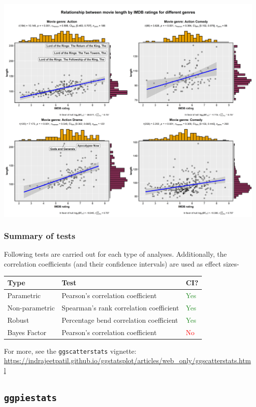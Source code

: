 \documentclass[]{article}
\begin{document}
\includegraphics[width=1\linewidth]{./figures/paper-ggscatterstats3-1}

\hypertarget{summary-of-tests-2}{%
\subsubsection{Summary of tests}\label{summary-of-tests-2}}

Following tests are carried out for each type of analyses. Additionally, the
correlation coefficients (and their confidence intervals) are used as effect
sizes-

\begin{longtable}[]{@{}lll@{}}
\toprule
Type & Test & CI?\tabularnewline
\midrule
\endhead
Parametric & Pearson's correlation coefficient & \textcolor{ForestGreen}{Yes}\tabularnewline
Non-parametric & Spearman's rank correlation coefficient & \textcolor{ForestGreen}{Yes}\tabularnewline
Robust & Percentage bend correlation coefficient & \textcolor{ForestGreen}{Yes}\tabularnewline
Bayes Factor & Pearson's correlation coefficient & \textcolor{red}{No}\tabularnewline
\bottomrule
\end{longtable}

For more, see the \texttt{ggscatterstats} vignette:
\url{https://indrajeetpatil.github.io/ggstatsplot/articles/web_only/ggscatterstats.html}

\hypertarget{ggpiestats}{%
\subsection{\texorpdfstring{\texttt{ggpiestats}}{ggpiestats}}\label{ggpiestats}}
\end{document}
